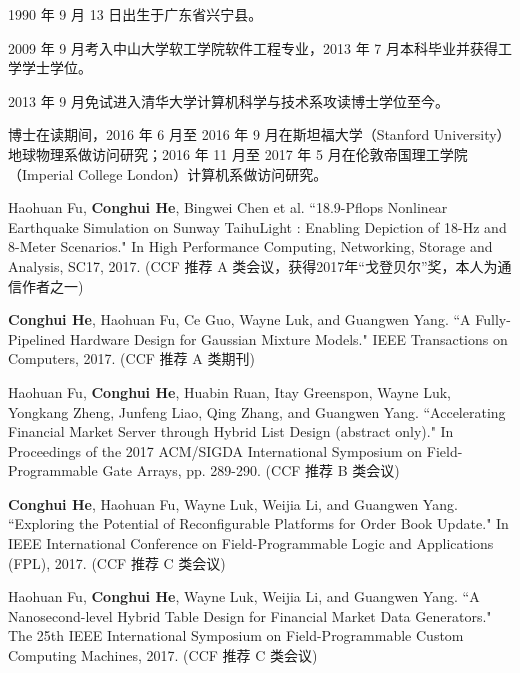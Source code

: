 \begin{resume}


  1990 年 9 月 13 日出生于广东省兴宁县。

  2009 年 9 月考入中山大学软工学院软件工程专业，2013 年 7 月本科毕业并获得工学学士学位。

  2013 年 9 月免试进入清华大学计算机科学与技术系攻读博士学位至今。

  博士在读期间，2016 年 6 月至 2016 年 9 月在斯坦福大学（Stanford University）地球物理系做访问研究；2016 年 11 月至 2017 年 5 月在伦敦帝国理工学院（Imperial College London）计算机系做访问研究。


  \begin{publications}
    \item Haohuan Fu, \textbf{Conghui He}, Bingwei Chen et al. ``18.9-Pflops Nonlinear Earthquake Simulation on Sunway TaihuLight : Enabling Depiction of 18-Hz and 8-Meter Scenarios." In High Performance Computing, Networking, Storage and Analysis, SC17, 2017. (CCF 推荐 A 类会议，获得2017年“戈登贝尔”奖，本人为通信作者之一)

    \item \textbf{Conghui He}, Haohuan Fu, Ce Guo, Wayne Luk, and Guangwen Yang. ``A Fully-Pipelined Hardware Design for Gaussian Mixture Models." IEEE Transactions on Computers, 2017. (CCF 推荐 A 类期刊)

    \item Haohuan Fu, \textbf{Conghui He}, Huabin Ruan, Itay Greenspon, Wayne Luk, Yongkang Zheng, Junfeng Liao, Qing Zhang, and Guangwen Yang. ``Accelerating Financial Market Server through Hybrid List Design (abstract only)." In Proceedings of the 2017 ACM/SIGDA International Symposium on Field-Programmable Gate Arrays, pp. 289-290. (CCF 推荐 B 类会议)

    \item \textbf{Conghui He}, Haohuan Fu, Wayne Luk, Weijia Li, and Guangwen Yang. ``Exploring the Potential of Reconfigurable Platforms for Order Book Update." In IEEE International Conference on Field-Programmable Logic and Applications (FPL), 2017. (CCF 推荐 C 类会议)

    \item Haohuan Fu, \textbf{Conghui He}, Wayne Luk, Weijia Li, and Guangwen Yang. ``A Nanosecond-level Hybrid Table Design for Financial Market Data Generators." The 25th IEEE International Symposium on Field-Programmable Custom Computing Machines, 2017. (CCF 推荐 C 类会议)


\end{publications}
\end{resume}
